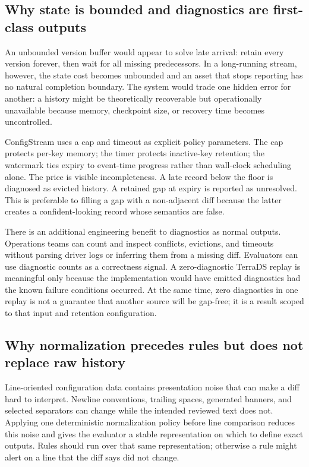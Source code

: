 \documentclass[a4paper,11pt]{article}
\begin{document}
\subsection{Why state is bounded and diagnostics are first-class outputs}

An unbounded version buffer would appear to solve late arrival: retain every version forever, then wait for all missing predecessors. In a long-running stream, however, the state cost becomes unbounded and an asset that stops reporting has no natural completion boundary. The system would trade one hidden error for another: a history might be theoretically recoverable but operationally unavailable because memory, checkpoint size, or recovery time becomes uncontrolled.

ConfigStream uses a cap and timeout as explicit policy parameters. The cap protects per-key memory; the timer protects inactive-key retention; the watermark ties expiry to event-time progress rather than wall-clock scheduling alone. The price is visible incompleteness. A late record below the floor is diagnosed as evicted history. A retained gap at expiry is reported as unresolved. This is preferable to filling a gap with a non-adjacent diff because the latter creates a confident-looking record whose semantics are false.

There is an additional engineering benefit to diagnostics as normal outputs. Operations teams can count and inspect conflicts, evictions, and timeouts without parsing driver logs or inferring them from a missing diff. Evaluators can use diagnostic counts as a correctness signal. A zero-diagnostic TerraDS replay is meaningful only because the implementation would have emitted diagnostics had the known failure conditions occurred. At the same time, zero diagnostics in one replay is not a guarantee that another source will be gap-free; it is a result scoped to that input and retention configuration.

\subsection{Why normalization precedes rules but does not replace raw history}

Line-oriented configuration data contains presentation noise that can make a diff hard to interpret. Newline conventions, trailing spaces, generated banners, and selected separators can change while the intended reviewed text does not. Applying one deterministic normalization policy before line comparison reduces this noise and gives the evaluator a stable representation on which to define exact outputs. Rules should run over that same representation; otherwise a rule might alert on a line that the diff says did not change.
\end{document}

